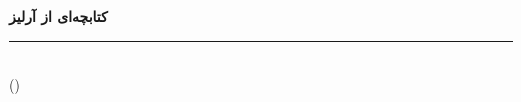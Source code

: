 \begin{titlepage}
\thispagestyle{empty}
\begin{center}
\vspace*{3cm}

{\sffamily\footnotesize\bfseries\color{accent}کتابچه‌ای از آرلیز}

\vspace{1.5cm}

{\bfseries\Huge\color{primary}\BookletTitle\par}

\vspace{0.8cm}
\textcolor{accent}{\rule{0.35\textwidth}{1.2pt}}
\vspace{0.8cm}

{\Large\itshape\color{textsecondary}\BookletSubtitle\par}

\vfill

{\large\bfseries\BookletAuthor}\\[0.2em]
{\small\color{textsecondary}(\lr{\BookletAuthorHandle})}\\[0.2em]
{\small\ttfamily\color{textsecondary}\lr{\BookletEmail}}

\vspace{1.5cm}
{\small\color{textsecondary}\BookletYear}

\end{center}
\end{titlepage}